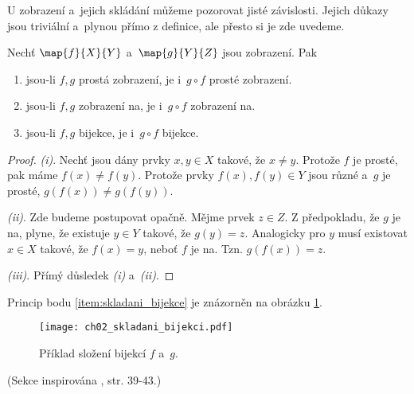 U zobrazení a~jejich skládání můžeme pozorovat jisté závislosti. Jejich důkazy jsou triviální a~plynou přímo z definice, ale přesto si je zde uvedeme.
\begin{proposition}\label{prop:vlastnosti_skladani_zobrazeni}
    Nechť $\map{f}{X}{Y}$ a~$\map{g}{Y}{Z}$ jsou zobrazení. Pak
    \begin{enumerate}[label=(\roman*)]
        \item\label{item:skladani_injekce} jsou-li $f,g$ prostá zobrazení, je i~$g\circ f$ prosté zobrazení.
        \item\label{item:skladani_surjekce} jsou-li $f,g$ zobrazení na, je i~$g\circ f$ zobrazení na.
        \item\label{item:skladani_bijekce} jsou-li $f,g$ bijekce, je i~$g\circ f$ bijekce.
    \end{enumerate}
\end{proposition}
\begin{proof}
    \textit{(i)}. Nechť jsou dány prvky $x,y\in X$ takové, že $x\neq y$. Protože $f$ je prosté, pak máme $f(x)\neq f(y)$. Protože prvky $f(x),f(y)\in Y$ jsou různé a~$g$ je prosté, $g(f(x))\neq g(f(y))$.\par
    \textit{(ii)}. Zde budeme postupovat opačně. Mějme prvek $z\in Z$. Z předpokladu, že $g$ je na, plyne, že existuje $y\in Y$ takové, že $g(y)=z$. Analogicky pro $y$ musí existovat $x\in X$ takové, že $f(x)=y$, neboť $f$ je na. Tzn. $g(f(x))=z$.\par
    \textit{(iii)}. Přímý důsledek \textit{(i)} a~\textit{(ii)}.
\end{proof}
Princip bodu \ref{item:skladani_bijekce} je znázorněn na obrázku \ref{fig:skladani_bijekci}.
\begin{figure}[H]
    \centering
    \texttt{[image: ch02\_skladani\_bijekci.pdf]}
    \caption{Příklad složení bijekcí $f$ a~$g$.}
    \label{fig:skladani_bijekci}
\end{figure}
(Sekce inspirována \cite{MatousekNesetril2009}, str. 39-43.)